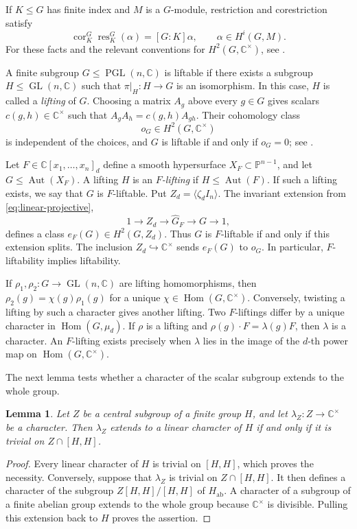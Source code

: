 \documentclass[12pt]{amsart}
\numberwithin{equation}{section}
\theoremstyle{plain}
\newtheorem{lem}[thm]{Lemma}
\theoremstyle{definition}
\theoremstyle{remark}
\newcommand{\CC}{\mathbb C}
\newcommand{\PP}{\mathbb P}
\DeclareMathOperator{\Aut}{Aut}
\DeclareMathOperator{\GL}{GL}
\DeclareMathOperator{\PGL}{PGL}
\DeclareMathOperator{\Hom}{Hom}
\begin{document}
If $K\leq G$ has finite index and $M$ is a $G$-module, restriction and
corestriction satisfy
\[
\operatorname{cor}_K^G\operatorname{res}_K^G(\alpha)
=[G:K]\alpha,
\qquad \alpha\in H^i(G,M).
\]
For these facts and the relevant conventions for $H^2(G,\CC^\times)$,
see \cite[\S2.2]{xiezhenglift}.

A finite subgroup $G\leq\PGL(n,\CC)$ is liftable if there exists a
subgroup $H\leq\GL(n,\CC)$ such that
$\pi|_H\colon H\to G$ is an isomorphism.  In this
case, $H$ is called a \emph{lifting} of $G$.  Choosing a matrix
$A_g$ above every $g\in G$ gives scalars $c(g,h)\in\CC^\times$ such that
$A_gA_h=c(g,h)A_{gh}$.  Their cohomology class
\[
o_G\in H^2(G,\CC^\times)
\]
is independent of the choices, and $G$ is liftable if and only if
$o_G=0$; see \cite[\S3]{xiezhenglift}.

Let $F\in\CC[x_1,\ldots,x_n]_d$ define a smooth hypersurface
$X_F\subset\PP^{n-1}$, and let $G\leq\Aut(X_F)$.  A lifting $H$ is an
\emph{$F$-lifting} if
$H\leq\Aut(F)$.  If such a lifting exists, we say that $G$ is
$F$-liftable.  Put $Z_d=\langle\zeta_dI_n\rangle$.  The invariant
extension from \eqref{eq:linear-projective},
\[
1\longrightarrow Z_d\longrightarrow\widehat G_F
\longrightarrow G\longrightarrow1,
\]
defines a class $e_F(G)\in H^2(G,Z_d)$.  Thus $G$ is $F$-liftable if and
only if this extension splits.  The inclusion $Z_d\hookrightarrow\CC^\times$ sends
$e_F(G)$ to $o_G$.  In particular, $F$-liftability implies liftability.

If $\rho_1,\rho_2\colon G\to\GL(n,\CC)$ are lifting homomorphisms, then
$\rho_2(g)=\chi(g)\rho_1(g)$ for a unique
$\chi\in\Hom(G,\CC^\times)$.  Conversely, twisting a lifting by such a
character gives another lifting. Two $F$-liftings differ by a unique character in $\Hom(G,\mu_d)$. If $\rho$ is a lifting
and $\rho(g)\cdot F=\lambda(g)F$, then $\lambda$ is a character.  An
$F$-lifting exists precisely when $\lambda$ lies in the image of the
$d$-th power map on $\Hom(G,\CC^\times)$.

The next lemma tests whether a character of the scalar subgroup extends
to the whole group.

\begin{lem}\label{lem:central-character-extension}
Let $Z$ be a central subgroup of a finite group $H$, and let
$\lambda_Z\colon Z\to\CC^\times$ be a character.  Then $\lambda_Z$ extends
to a linear character of $H$ if and only if it is trivial on
$Z\cap[H,H]$.
\end{lem}

\begin{proof}
Every linear character of $H$ is trivial on $[H,H]$, which proves the
necessity.  Conversely, suppose that $\lambda_Z$ is trivial on
$Z\cap[H,H]$.  It then defines a character of the subgroup
$Z[H,H]/[H,H]$ of $H_{\mathrm{ab}}$.  A character of a subgroup of a finite
abelian group extends to the whole group because $\CC^\times$ is divisible.
Pulling this extension back to $H$ proves the assertion.
\end{proof}
\end{document}
